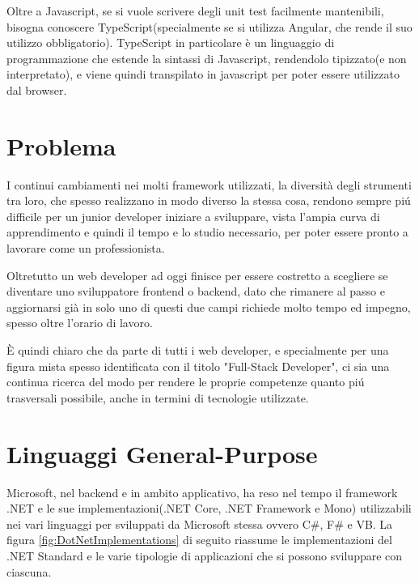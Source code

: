 Oltre a Javascript, se si vuole scrivere degli unit test facilmente mantenibili, bisogna conoscere TypeScript(specialmente se si utilizza Angular, che rende il suo utilizzo obbligatorio).
TypeScript in particolare \`e un linguaggio di programmazione che estende la sintassi di Javascript, rendendolo tipizzato(e non interpretato), e viene quindi transpilato in javascript per poter essere utilizzato dal browser.

\section{Problema}\label{sez:problema}
I continui cambiamenti nei molti framework utilizzati, la diversit\`a degli strumenti tra loro, che spesso realizzano in modo diverso la stessa cosa, rendono sempre pi\'u difficile per un junior developer iniziare a sviluppare, vista l'ampia curva di apprendimento e quindi il tempo e lo studio necessario, per poter essere pronto a lavorare come un professionista.

Oltretutto un web developer ad oggi finisce per essere costretto a scegliere se diventare uno sviluppatore frontend o backend, dato che rimanere al passo e aggiornarsi gi\`a in solo uno di questi due campi richiede molto tempo ed impegno, spesso oltre l'orario di lavoro.

\`E quindi chiaro che da parte di tutti i web developer, e specialmente per una figura mista spesso identificata con il titolo "Full-Stack Developer", ci sia una continua ricerca del modo per rendere le proprie competenze quanto pi\'u trasversali possibile, anche in termini di tecnologie utilizzate.

\pagebreak

\section{Linguaggi General-Purpose}\label{sez:problema}
Microsoft, nel backend e in ambito applicativo, ha reso nel tempo il framework .NET e le sue implementazioni(.NET Core, .NET Framework e Mono) utilizzabili nei vari linguaggi per sviluppati da Microsoft stessa ovvero C\#, F\# e VB.
La figura \ref{fig:DotNetImplementations} di seguito riassume le implementazioni del .NET Standard e le varie tipologie di applicazioni che si possono sviluppare con ciascuna.

